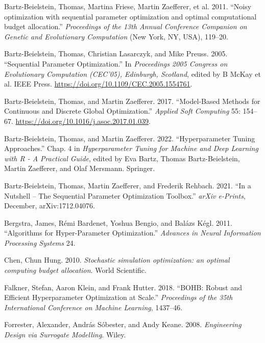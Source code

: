 \documentclass[
  twocolumn]{article}
\newlength{\cslhangindent}
\newenvironment{CSLReferences}[2] %
 {\begin{list}{}{%
  \setlength{\itemindent}{0pt}
  \setlength{\leftmargin}{0pt}
  \setlength{\parsep}{0pt}
  \ifodd #1
   \setlength{\leftmargin}{\cslhangindent}
   \setlength{\itemindent}{-1\cslhangindent}
  \fi
  \setlength{\itemsep}{#2\baselineskip}}}
 {\end{list}}
\begin{document}
\begin{CSLReferences}{1}{1}
Bartz-Beielstein, Thomas, Martina Friese, Martin Zaefferer, et al. 2011.
{``{Noisy optimization with sequential parameter optimization and
optimal computational budget allocation}.''} \emph{Proceedings of the
13th Annual Conference Companion on Genetic and Evolutionary
Computation} (New York, NY, USA), 119--20.

Bartz-Beielstein, Thomas, Christian Lasarczyk, and Mike Preuss. 2005.
{``{Sequential Parameter Optimization}.''} In \emph{{Proceedings 2005
Congress on Evolutionary Computation (CEC'05), Edinburgh, Scotland}},
{edited by B McKay et al.} {IEEE Press}.
\url{https://doi.org/10.1109/CEC.2005.1554761}.

Bartz-Beielstein, Thomas, and Martin Zaefferer. 2017. {``Model-Based
Methods for Continuous and Discrete Global Optimization.''}
\emph{Applied Soft Computing} 55: 154--67.
\url{https://doi.org/10.1016/j.asoc.2017.01.039}.

Bartz-Beielstein, Thomas, and Martin Zaefferer. 2022. {``Hyperparameter
Tuning Approaches.''} Chap. 4 in \emph{{Hyperparameter Tuning for
Machine and Deep Learning with R - A Practical Guide}}, edited by Eva
Bartz, Thomas Bartz-Beielstein, Martin Zaefferer, and Olaf Mersmann.
Springer.

Bartz-Beielstein, Thomas, Martin Zaefferer, and Frederik Rehbach. 2021.
{``{In a Nutshell -- The Sequential Parameter Optimization Toolbox}.''}
\emph{arXiv e-Prints}, December, arXiv:1712.04076.

Bergstra, James, Rémi Bardenet, Yoshua Bengio, and Balázs Kégl. 2011.
{``{Algorithms for Hyper-Parameter Optimization}.''} \emph{Advances in
Neural Information Processing Systems} 24.

Chen, Chun Hung. 2010. \emph{{Stochastic simulation optimization: an
optimal computing budget allocation}}. World Scientific.

Falkner, Stefan, Aaron Klein, and Frank Hutter. 2018. {``{BOHB: Robust
and Efficient Hyperparameter Optimization at Scale}.''}
\emph{Proceedings of the 35th International Conference on Machine
Learning}, 1437--46.

Forrester, Alexander, András Sóbester, and Andy Keane. 2008.
\emph{{Engineering Design via Surrogate Modelling}}. Wiley.


\end{CSLReferences}
\end{document}
